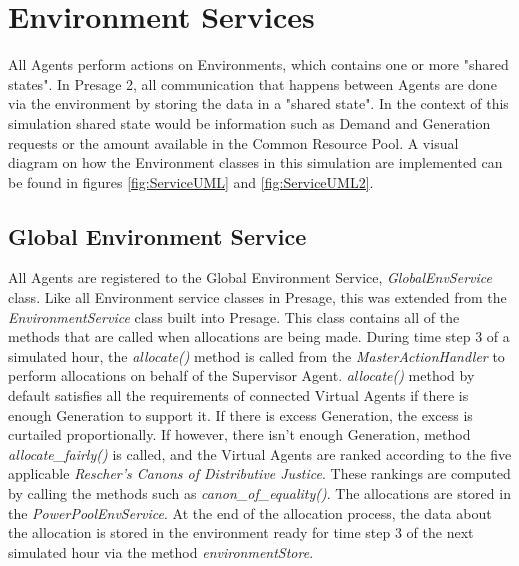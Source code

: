 \clearpage


\section*{Environment Services}

All Agents perform actions on Environments, which contains one or more "shared states". In Presage 2, all communication that happens between Agents are done via the environment by storing the data in a "shared state". In the context of this simulation shared state would be information such as Demand and Generation requests or the amount available in the Common Resource Pool. A visual diagram on how the Environment classes in this simulation are implemented can be found in figures \ref{fig:ServiceUML} and \ref{fig:ServiceUML2}.

\subsection*{Global Environment Service}
All Agents are registered to the Global Environment Service, \textit{GlobalEnvService} class. Like all Environment service classes in Presage, this was extended from the \textit{EnvironmentService} class built into Presage. This class contains all of the methods that are called when allocations are being made. During time step 3 of a simulated hour, the \textit{allocate()} method is called from the \textit{MasterActionHandler} to perform allocations on behalf of the Supervisor Agent. \textit{allocate()} method by default satisfies all the requirements of connected Virtual Agents if there is enough Generation to support it. If there is excess Generation, the excess is curtailed proportionally. 
If however, there isn't enough Generation, method \textit{allocate\_fairly()} is called, and the Virtual Agents are ranked according to the five applicable \textit{Rescher's Canons of Distributive Justice}. These rankings are computed by calling the methods such as \textit{canon\_of\_equality()}. The allocations are stored in the \textit{PowerPoolEnvService}.
At the end of the allocation process, the data about the allocation is stored in the environment ready for time step 3 of the next simulated hour via the method \textit{environmentStore}.

